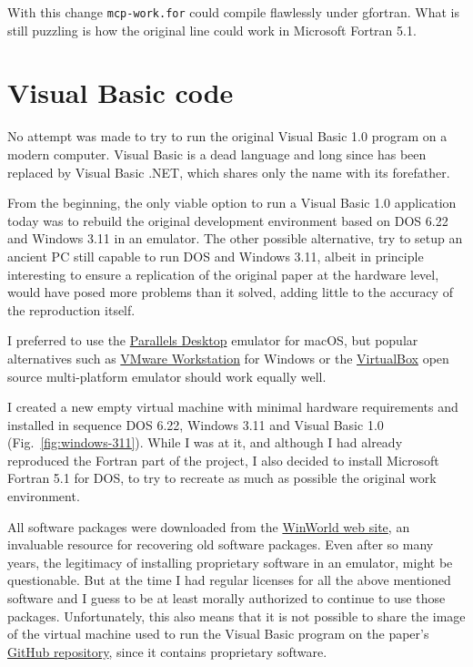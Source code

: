 With this change \texttt{mcp-work.for} could compile flawlessly under gfortran.
What is still puzzling is how the original line could work in Microsoft Fortran 5.1.



\section{Visual Basic code}
\label{visual-basic-code}

No attempt was made to try to run the original Visual Basic 1.0 program on a modern computer. Visual Basic is a dead language and long since has been replaced by Visual Basic .NET, which shares only the name with its forefather.
 
From the beginning, the only viable option to run a Visual Basic 1.0 application today was to rebuild the original development environment based on DOS 6.22 and Windows 3.11 in an emulator.
The other possible alternative, try to setup an ancient PC still capable to run DOS and Windows 3.11, albeit in principle interesting to ensure a replication of the original paper at the hardware level, would have posed more problems than it solved, adding little to the accuracy of the reproduction itself.

I preferred to use the \href{https://www.parallels.com/}{Parallels Desktop} emulator for macOS, but popular alternatives such as \href{https://www.vmware.com/products/workstation-player.html}{VMware Workstation} for Windows or the \href{https://www.virtualbox.org/}{VirtualBox} open source multi-platform emulator should work equally well.

I created a new empty virtual machine with minimal hardware requirements and installed in sequence DOS 6.22, Windows 3.11 and Visual Basic 1.0 (Fig.~\ref{fig:windows-311}).
While I was at it, and although I had already reproduced the Fortran part of the project, I also decided to install Microsoft Fortran 5.1 for DOS, to try to recreate as much as possible the original work environment.

All software packages were downloaded from the \href{https://winworldpc.com}{WinWorld web site}, an invaluable resource for recovering old software packages. 
Even after so many years, the legitimacy of installing proprietary software in an emulator, might be questionable. But at the time I had regular licenses for all the above mentioned software and I guess to be at least morally authorized to continue to use those packages.
Unfortunately, this also means that it is not possible to share the image of the virtual machine used to run the Visual Basic program on the paper's \href{https://github.com/sabinomaggi/ten-years-challenge-pulsed-drive}{GitHub repository}, since it contains proprietary software.

